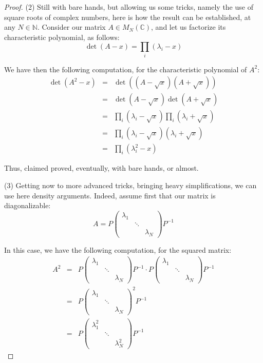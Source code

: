 \documentclass[12pt]{amsbook}
\begin{document}
\begin{proof}
(2) Still with bare hands, but allowing us some tricks, namely the use of square roots of complex numbers, here is how the result can be established, at any $N\in\mathbb N$. Consider our matrix $A\in M_N(\mathbb C)$, and let us factorize its characteristic polynomial, as follows:
$$\det(A-x)=\prod_i(\lambda_i-x)$$

We have then the following computation, for the characteristic polynomial of $A^2$:
\begin{eqnarray*}
\det(A^2-x)
&=&\det((A-\sqrt{x})(A+\sqrt{x}))\\
&=&\det(A-\sqrt{x})\det(A+\sqrt{x})\\
&=&\prod_i(\lambda_i-\sqrt{x})\prod_i(\lambda_i+\sqrt{x})\\
&=&\prod_i(\lambda_i-\sqrt{x})(\lambda_i+\sqrt{x})\\
&=&\prod_i(\lambda_i^2-x)
\end{eqnarray*}

Thus, claimed proved, eventually, with bare hands, or almost.

\medskip

(3) Getting now to more advanced tricks, bringing heavy simplifications, we can use here density arguments. Indeed, assume first that our matrix is diagonalizable:
$$A=P\begin{pmatrix}
\lambda_1\\
&\ddots\\
&&\lambda_N
\end{pmatrix}
P^{-1}$$

In this case, we have the following computation, for the squared matrix:
\begin{eqnarray*}
A^2
&=&P\begin{pmatrix}
\lambda_1\\
&\ddots\\
&&\lambda_N
\end{pmatrix}
P^{-1}\cdot P\begin{pmatrix}
\lambda_1\\
&\ddots\\
&&\lambda_N
\end{pmatrix}
P^{-1}\\
&=&P\begin{pmatrix}
\lambda_1\\
&\ddots\\
&&\lambda_N
\end{pmatrix}^2
P^{-1}\\
&=&P\begin{pmatrix}
\lambda_1^2\\
&\ddots\\
&&\lambda_N^2
\end{pmatrix}
P^{-1}
\end{eqnarray*}


\end{proof}
\end{document}
